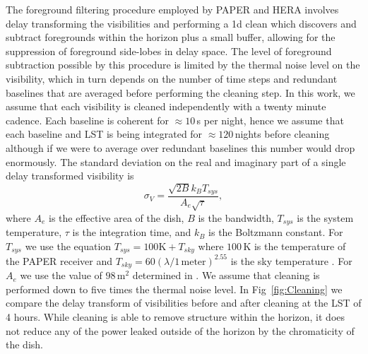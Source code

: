 \documentclass[twocolumn]{emulateapj}
\begin{document}
The foreground filtering procedure employed by PAPER and HERA involves delay transforming the visibilities and performing a 1d clean which discovers and subtract foregrounds within the horizon plus a small buffer, allowing for the suppression of foreground side-lobes in delay space. The level of foreground subtraction possible by this procedure is limited by the thermal noise level on the visibility, which in turn depends on the number of time steps and redundant baselines that are averaged before performing the cleaning step. In this work, we assume that each visibility is cleaned independently with a twenty minute cadence. Each baseline is coherent for $\approx 10$\,s per night, hence we assume that each baseline and LST is being integrated for $\approx 120$\,nights before cleaning although if we were to average over redundant baselines this number would drop enormously. The standard deviation on the real and imaginary part of a single delay transformed visibility is \citep{Morales:2004}
\begin{equation}
\sigma_V = \frac{\sqrt{2 B} k_B T_{sys}}{A_e \sqrt{\tau}},
\end{equation}
where $A_e$ is the effective area of the dish, $B$ is the bandwidth, $T_{sys}$ is the system temperature, $\tau$ is the integration time, and $k_B$ is the Boltzmann constant. For $T_{sys}$ we use the equation $T_{sys} = 100\text{K} + T_{sky}$ where $100$\,K is the temperature of the PAPER receiver and $T_{sky} = 60 (\lambda/1\,\text{meter} )^{2.55}$ is the sky temperature \citep{Fixsen:2011}. For $A_e$ we use the value of $98$\,m$^2$ determined in \citet{Neben:2016}. We assume that cleaning is performed down to five times the thermal noise level. In Fig~\ref{fig:Cleaning} we compare the delay transform of visibilities before and after cleaning at the LST of 4 hours. While cleaning is able to remove structure within the horizon, it does not reduce any of the power leaked outside of the horizon by the chromaticity of the dish. 
\end{document}
